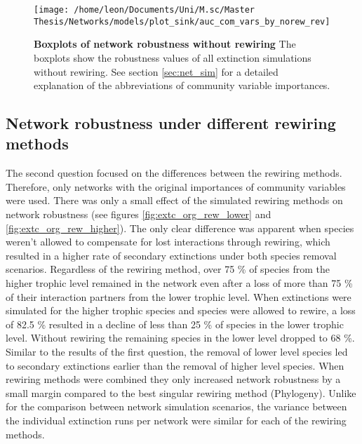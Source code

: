 \documentclass[12pt,a4paper]{article}
\begin{document}
\begin{figure}[H]
	 \centering
	 \texttt{[image: /home/leon/Documents/Uni/M.sc/Master Thesis/Networks/models/plot\_sink/auc\_com\_vars\_by\_norew\_rev]}
	 \captionsetup{width = \textwidth}
	 \caption[Boxplots of network robustness without rewiring]{\textbf{Boxplots of network robustness without rewiring} The boxplots show the robustness values of all extinction simulations without rewiring. See section \ref{sec:net_sim} for a detailed explanation of the abbreviations of community variable importances.}
	 \label{fig:auc_cv_norew}
\end{figure}



\subsection{Network robustness under different rewiring methods}

The second question focused on the differences between the rewiring methods. Therefore, only networks with the original importances of community variables were used. There was only a small effect of the simulated rewiring methods on network robustness  (see figures \ref{fig:extc_org_rew_lower} and \ref{fig:extc_org_rew_higher}). The only clear difference was apparent when species weren't allowed to compensate for lost interactions through rewiring, which resulted in a higher rate of secondary extinctions under both species removal scenarios.
Regardless of the rewiring method, over 75 \% of species from the higher trophic level remained in the network even after a loss of more than 75 \% of their interaction partners from the lower trophic level. When extinctions were simulated for the higher trophic species and species were allowed to rewire, a loss of 82.5 \% resulted in a decline of less than 25 \% of species in the lower trophic level. Without rewiring the remaining species in the lower level dropped to 68 \%.\\ Similar to the results of the first question, the removal of lower level species led to secondary extinctions earlier than the removal of higher level species. When rewiring methods were combined they only increased network robustness by a small margin compared to the best singular rewiring method (Phylogeny). Unlike for the comparison between network simulation scenarios, the variance between the individual extinction runs per network were similar for each of the rewiring methods. 
\end{document}
